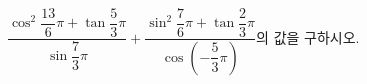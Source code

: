 $\dfrac{\cos^2\dfrac{13}{6}\pi+\tan\dfrac{5}{3}\pi}{\sin\dfrac{7}{3}\pi}+\dfrac{\sin^2\dfrac{7}{6}\pi+\tan\dfrac{2}{3}\pi}{\cos\left(-\dfrac{5}{3}\pi\right)}$의 값을 구하시오.
